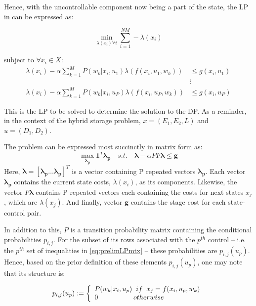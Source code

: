 \documentclass[conference]{IEEEtran}
\begin{document}
Hence, with the uncontrollable component now being a part of the state, the LP in \cite{Bertsekas:2007:DPO:1396348} can be expressed as:

\begin{equation} \label{eq:prelimLP}
\min_{\lambda(x_{i}) \forall i} \sum_{i=1}^{NM} -\lambda(x_{i})
\end{equation}

subject to $\forall x_{i} \in X$: \begin{align*}
\lambda(x_{i})-\alpha\sum_{k=1}^{M}P(w_{k} | x_{i},u_{1})\lambda(f(x_{i},u_{1},w_{k})) &\leq g(x_{i},u_{1}) \\
&\vdots\\
\lambda(x_{i})-\alpha\sum_{k=1}^{M}P(w_{k} | x_{i},u_{P})\lambda(f(x_{i},u_{P},w_{k})) &\leq g(x_{i},u_{P})
\end{align*}

This is the LP to be solved to determine the solution to the DP. As a reminder, in the context of the hybrid storage problem, $x=(E_{1},E_{2},L)$ and $u=(D_{1},D_{2})$.

The problem can be expressed most succinctly in matrix form as:
\begin{equation} \label{eq:prelimLPmtx}
    \max_{\boldsymbol{\lambda_{p}}} \boldsymbol{1}^{T} \boldsymbol{\lambda_{p}}
    \hspace{1em}s.t.\hspace{1em}
    \boldsymbol{\lambda}-\alpha PF\boldsymbol{\lambda} \leq \boldsymbol{g}
\end{equation} Here, $\boldsymbol{\lambda} = [\boldsymbol{\lambda_{p}}\hdots \boldsymbol{\lambda_{p}}]^{T}$ is a vector containing P repeated vectors $\boldsymbol{\lambda_{p}}$. Each vector $\boldsymbol{\lambda_{p}}$ contains the current state costs, $\lambda(x_{i})$, as its components. Likewise, the vector $F\boldsymbol{\lambda}$ contains P repeated vectors each containing the costs for next states $x_{j}$, which are $\lambda(x_{j})$. And finally, vector $\boldsymbol{g}$ contains the stage cost for each state-control pair. 

In addition to this, $P$ is a transition probability matrix containing the conditional probabilities $p_{i,j}$. For the subset of its rows associated with the $p^{th}$ control -- i.e. the $p^{th}$ set of inequalities in \eqref{eq:prelimLPmtx} -- these probabilities are $p_{i,j}(u_{p})$. Hence, based on the prior definition of these elements $p_{i,j}(u_{p})$, one may note that its structure is:

\begin{displaymath}
p_{i,j}(u_{p}):=
\left\{
\begin{array}{l}
P(w_{k}|x_{i},u_{p}) \hspace{0.2cm} if \hspace{0.2cm} x_{j}=f(x_{i},u_{p},w_{k})\\
0 \hspace{1.8cm} otherwise
\end{array}
\right.
\end{displaymath}
\end{document}
